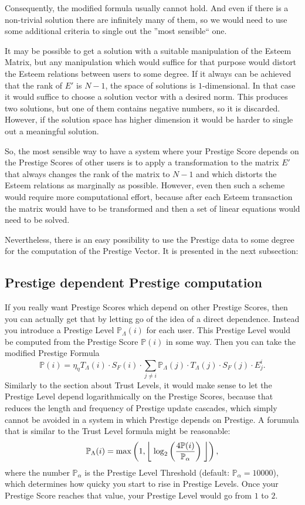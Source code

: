 \documentclass[a4paper,12pt]{scrartcl}
\newcounter{formula}
\begin{document}
Consequently, the modified formula usually cannot hold. And even if there is a non-trivial solution there are infinitely many of them, so we would need to use some additional criteria to single out the ''most sensible`` one. 

It may be possible to get a solution with a suitable manipulation of the Esteem Matrix, but any manipulation which would suffice for that purpose would distort the Esteem relations between users to some degree. If it always can be achieved that the rank of $E'$ is $N-1$, the space of solutions is $1$-dimensional. In that case it would suffice to choose a solution vector with a desired norm. This produces two solutions, but one of them contains negative numbers, so it is discarded. However, if the solution space has higher dimension it would be harder to single out a meaningful solution.

So, the most sensible way to have a system where your Prestige Score depends on the Prestige Scores of other users is to apply a transformation to the matrix $E'$ that always changes the rank of the matrix to $N-1$ and which distorts the Esteem relations as marginally as possible. However, even then such a scheme would require more computational effort, because after each Esteem transaction the matrix would have to be transformed and then a set of linear equations would need to be solved.

Nevertheless, there is an easy possibility to use the Prestige data to some degree for the computation of the Prestige Vector. It is presented in the next subsection:

\subsection{Prestige dependent Prestige computation}
If you really want Prestige Scores which depend on other Prestige Scores, then you can actually get that by letting go of the idea of a direct dependence. Instead you introduce a  Prestige Level $\mathbb{P}_{\Lambda}(i)$ for each user. This Prestige Level would be computed from the Prestige Score $\mathbb{P}(i)$ in some way. Then you can take the modified Prestige Formula
$$\mathbb{P}(i) = \eta_{\eta} T_{\Lambda}(i) \cdot S_F(i) \cdot \sum_{j \neq i} \mathbb{P}_{\Lambda}(j) \cdot T_{\Lambda}(j) \cdot S_F(j) \cdot E^i_j.$$
Similarly to the section about Trust Levels, it would make sense to let the Prestige Level depend logarithmically on the Prestige Scores, because that reduces the length and frequency of Prestige update cascades, which simply cannot be avoided in a system in which Prestige depends on Prestige. A forumula that is similar to the Trust Level formula might be reasonable:
$$\mathbb{P}_{\Lambda}(i) = \max \left( 1, \biggm\lfloor  \log_2 \left( \frac{4\mathbb{P}(i)}{\mathbb{P}_{\alpha}}\right) \biggm\rfloor \right),$$
where the number $\mathbb{P}_{\alpha}$ is the Prestige Level Threshold (default: $\mathbb{P}_{\alpha} = 10000$), which determines how quicky you start to rise in Prestige Levels. Once your Prestige Score reaches that value, your Prestige Level would go from $1$ to $2$.
\end{document}
